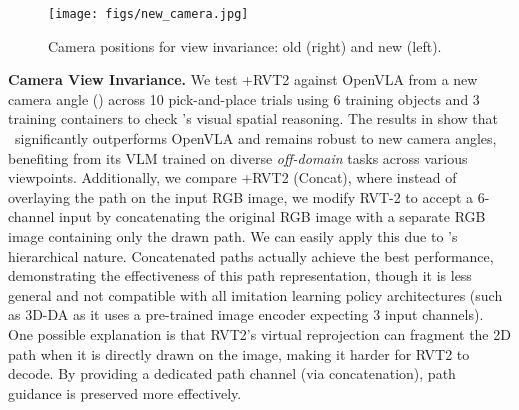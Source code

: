 \begin{wrapfigure}[15]{R}{0.3\textwidth}
    \centering
    \vspace{-0.4cm}
    \texttt{[image: figs/new\_camera.jpg]}
    \vspace{-0.7cm}
    \caption{\footnotesize Camera positions for view invariance: old (right) and new (left).}
    \label{fig:camera_angle}
\end{wrapfigure}
\textbf{Camera View Invariance.}
We test \method+RVT2 against OpenVLA from a new camera angle () across 10 pick-and-place trials using 6 training objects and 3 training containers to check \method's visual spatial reasoning.
% 
The results in  show that \method\ significantly outperforms OpenVLA and remains robust to new camera angles, benefiting from its VLM trained on diverse \emph{off-domain} tasks across various viewpoints. 
Additionally, we compare \method+RVT2 (Concat), where instead of overlaying the path on the input RGB image, we modify RVT-2 to accept a 6-channel input by concatenating the original RGB image with a separate RGB image containing only the drawn path.
We can easily apply this due to \method's hierarchical nature.
Concatenated paths actually achieve the best performance, demonstrating the effectiveness of this path representation, though it is less general and not compatible with all imitation learning policy architectures (such as 3D-DA as it uses a pre-trained image encoder expecting 3 input channels).
One possible explanation is that RVT2’s virtual reprojection can fragment the 2D path when it is directly drawn on the image, making it harder for RVT2 to decode. By providing a dedicated path channel (via concatenation), path guidance is preserved more effectively.



